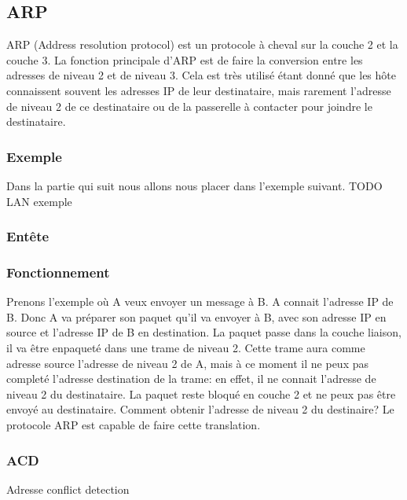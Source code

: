 \documentclass[twoside,openright,a4paper,11pt,french]{article}
\begin{document}
\subsection{ARP}
ARP (Address resolution protocol) est un protocole à cheval sur la couche 2 et
la couche 3. La fonction principale d'ARP est de faire la conversion entre les
adresses de niveau 2 et de niveau 3. Cela est très utilisé étant donné que les
hôte connaissent souvent les adresses IP de leur destinataire, mais rarement
l'adresse de niveau 2 de ce destinataire ou de la passerelle à contacter pour joindre
le destinataire.

\subsubsection{Exemple}
Dans la partie qui suit nous allons nous placer dans l'exemple suivant.
TODO LAN exemple
\subsubsection{Entête}

\subsubsection{Fonctionnement}
Prenons l'exemple où A veux envoyer un message à B. A connait l'adresse IP de
B. Donc A va préparer son paquet qu'il va envoyer à B, avec son adresse IP en
source et l'adresse IP de B en destination. La paquet passe dans la couche
liaison, il va être enpaqueté dans une trame de niveau 2. Cette trame aura
comme adresse source l'adresse de niveau 2 de A, mais à ce moment il ne peux
pas completé l'adresse destination de la trame: en effet, il ne connait
l'adresse de niveau 2 du destinataire. La paquet reste bloqué en couche 2 et ne
peux pas être envoyé au destinataire. Comment obtenir l'adresse de niveau 2 du destinaire?
Le protocole ARP est capable de faire cette translation.

\subsubsection{ACD}
Adresse conflict detection
\end{document}
